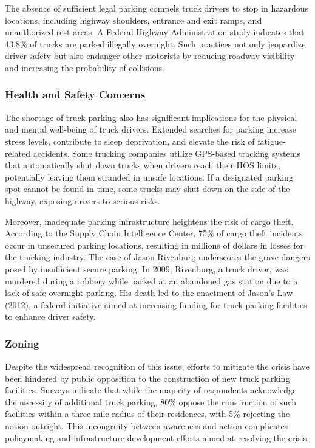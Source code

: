 \documentclass[
  12pt]{article}
\begin{document}
The absence of sufficient legal parking compels truck drivers to stop in
hazardous locations, including highway shoulders, entrance and exit
ramps, and unauthorized rest areas. A Federal Highway Administration
study indicates that 43.8\% of trucks are parked illegally overnight.
Such practices not only jeopardize driver safety but also endanger other
motorists by reducing roadway visibility and increasing the probability
of collisions.

\subsubsection{Health and Safety
Concerns}\label{health-and-safety-concerns}

The shortage of truck parking also has significant implications for the
physical and mental well-being of truck drivers. Extended searches for
parking increase stress levels, contribute to sleep deprivation, and
elevate the risk of fatigue-related accidents. Some trucking companies
utilize GPS-based tracking systems that automatically shut down trucks
when drivers reach their HOS limits, potentially leaving them stranded
in unsafe locations. If a designated parking spot cannot be found in
time, some trucks may shut down on the side of the highway, exposing
drivers to serious risks.

Moreover, inadequate parking infrastructure heightens the risk of cargo
theft. According to the Supply Chain Intelligence Center, 75\% of cargo
theft incidents occur in unsecured parking locations, resulting in
millions of dollars in losses for the trucking industry. The case of
Jason Rivenburg underscores the grave dangers posed by insufficient
secure parking. In 2009, Rivenburg, a truck driver, was murdered during
a robbery while parked at an abandoned gas station due to a lack of safe
overnight parking. His death led to the enactment of Jason's Law (2012),
a federal initiative aimed at increasing funding for truck parking
facilities to enhance driver safety.

\subsubsection{Zoning}\label{zoning}

Despite the widespread recognition of this issue, efforts to mitigate
the crisis have been hindered by public opposition to the construction
of new truck parking facilities. Surveys indicate that while the
majority of respondents acknowledge the necessity of additional truck
parking, 80\% oppose the construction of such facilities within a
three-mile radius of their residences, with 5\% rejecting the notion
outright. This incongruity between awareness and action complicates
policymaking and infrastructure development efforts aimed at resolving
the crisis.
\end{document}
